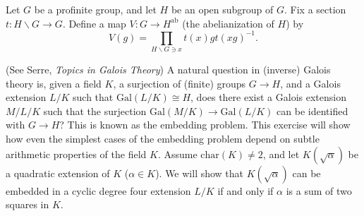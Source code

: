 \documentclass[11pt,answers,addpoints,reqno]{exam}
\theoremstyle{definition}
\theoremstyle{remark}
\theoremstyle{definition}
\theoremstyle{remark}
\theoremstyle{remark}
\newcommand{\Z}{\mathbb{Z}}
\DeclareMathOperator{\Ind}{Ind}
\DeclareMathOperator{\tr}{tr}
\newcommand{\Gal}{\mathrm{Gal}} %
\newcommand{\mr}{\mathrm}
\begin{document}
\begin{questions}
\question Let $G$ be a profinite group, and let $H$ be an open subgroup of $G$.
Fix a section $t \colon H \backslash G \to G$. Define a map $V \colon G \to H^{\mr{ab}}$ (the abelianization of $H$) by
\[
V(g)= \prod_{H \backslash G \ni x} t(x)gt(xg)^{-1}.
\]
\question(See Serre, \textit{Topics in Galois Theory}) A natural question in 
(inverse) Galois theory is, given a field $K$, a surjection of (finite) groups $G \to H$, and a Galois extension $L/K$ such that $\Gal(L/K) \cong H$, does there exist a Galois extension $M/L/K$ such that the surjection $\Gal(M/K) \to \Gal(L/K)$ can be identified with $G \to H$? This is known as the embedding problem. This exercise will show how even the simplest cases of the embedding problem depend on subtle arithmetic properties of the field $K$. Assume $\mr{char}(K) \neq 2$, and let $K(\sqrt{\alpha})$ be a quadratic extension of $K$ ($\alpha \in K$). We will show that $K(\sqrt{\alpha})$ can be embedded in a cyclic degree four extension $L/K$ if and only if $\alpha$ is a sum of two squares in $K$.
\begin{parts}

\end{parts}
\end{questions}
\end{document}
